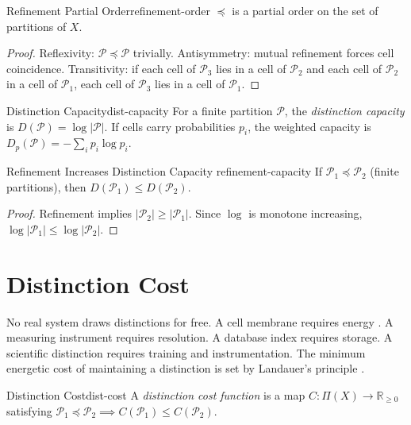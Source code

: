 \documentclass[12pt,twoside,openright]{book}
\newcommand{\partition}{\mathcal{P}}
\begin{document}
\begin{proposition}{Refinement Partial Order}{refinement-order}
  $\preceq$ is a partial order on the set of partitions
  of $X$.
\end{proposition}

\begin{proof}
  Reflexivity: $\partition \preceq \partition$ trivially.
  Antisymmetry: mutual refinement forces cell coincidence.
  Transitivity: if each cell of $\partition_3$ lies in a
  cell of $\partition_2$ and each cell of $\partition_2$
  in a cell of $\partition_1$, each cell of $\partition_3$
  lies in a cell of $\partition_1$.
\end{proof}

\begin{definition}{Distinction Capacity}{dist-capacity}
  For a finite partition $\partition$, the
  \emph{distinction capacity} is
  $D(\partition) = \log |\partition|$.
  If cells carry probabilities $p_i$, the weighted
  capacity is $D_p(\partition) = -\sum_i p_i \log p_i$.
\end{definition}

\begin{theorem}{Refinement Increases Distinction Capacity}%
  {refinement-capacity}
  If $\partition_1 \preceq \partition_2$ (finite
  partitions), then $D(\partition_1) \le D(\partition_2)$.
\end{theorem}

\begin{proof}
  Refinement implies $|\partition_2| \ge |\partition_1|$.
  Since $\log$ is monotone increasing,
  $\log|\partition_1| \le \log|\partition_2|$.
\end{proof}

\section{Distinction Cost}
\label{sec:ch1-cost}

No real system draws distinctions for free. A cell
membrane requires energy \parencite{schrodinger1944}.
A measuring instrument requires resolution.
A database index requires storage.
A scientific distinction requires training and
instrumentation. The minimum energetic cost of
maintaining a distinction is set by Landauer's principle
\parencite{landauer1961irreversibility}.

\begin{definition}{Distinction Cost}{dist-cost}
  A \emph{distinction cost function} is a map
  $C: \Pi(X) \to \mathbb{R}_{\ge 0}$ satisfying
  $\partition_1 \preceq \partition_2 \implies
  C(\partition_1) \le C(\partition_2)$.
\end{definition}
\end{document}
